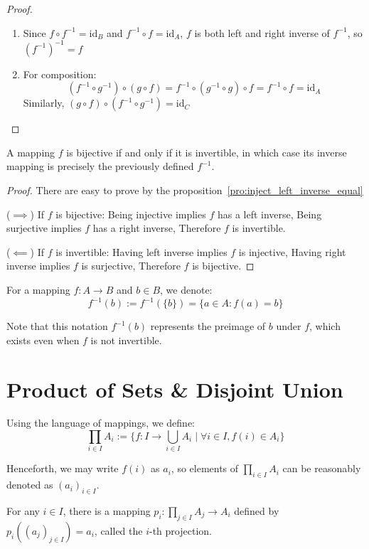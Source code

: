 \documentclass[11pt,lang=en]{elegantbook}
\begin{document}
\begin{proof}
  \begin{enumerate}
    \item Since $f \circ f^{-1} = \text{id}_B$ and $f^{-1} \circ f = \text{id}_A$,
          $f$ is both left and right inverse of $f^{-1}$, so $(f^{-1})^{-1} = f$
    
    \item For composition:
    \[
      (f^{-1} \circ g^{-1}) \circ (g \circ f) = f^{-1} \circ (g^{-1} \circ g) \circ f = f^{-1} \circ f = \text{id}_A
    \]
    Similarly, $(g \circ f) \circ (f^{-1} \circ g^{-1}) = \text{id}_C$
  \end{enumerate}
\end{proof}

\begin{proposition}
  A mapping $f$ is bijective if and only if it is invertible, in which case its inverse mapping is precisely the previously defined $f^{-1}$.
\end{proposition}

\begin{proof} There are easy to prove by the proposition~\ref{pro:inject_left_inverse_equal}

  ($\implies$) If $f$ is bijective: Being injective implies $f$ has a left inverse, Being surjective implies $f$ has a right inverse, Therefore $f$ is invertible.
 
  ($\impliedby$) If $f$ is invertible: Having left inverse implies $f$ is injective, Having right inverse implies $f$ is surjective, Therefore $f$ is bijective.
\end{proof}

\begin{definition}[Preimage]
  For a mapping $f : A \to B$ and $b \in B$, we denote:
  \[
    f^{-1}(b) := f^{-1}(\{b\}) = \{a \in A : f(a) = b\}
  \]
\end{definition}

\begin{remark}
  Note that this notation $f^{-1}(b)$ represents the preimage of $b$ under $f$, which exists even when $f$ is not invertible.
\end{remark}

\section{Product of Sets \& Disjoint Union}

\begin{definition}
  Using the language of mappings, we define:
  \[
    \prod_{i \in I} A_i := \{f : I \to \bigcup_{i \in I} A_i \mid \forall i \in I, f(i) \in A_i\} 
  \]
  
  Henceforth, we may write $f(i)$ as $a_i$, so elements of $\prod_{i \in I} A_i$ can be reasonably denoted as $(a_i)_{i \in I}$.

  For any $i \in I$, there is a mapping $p_i : \prod_{j \in I} A_j \to A_i$ defined by $p_i((a_j)_{j \in I}) = a_i$, called the $i$-th projection.
\end{definition}
\end{document}
